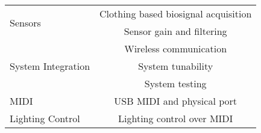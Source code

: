     \begin{tabular}{|l|c|}
        \hline
        \multirow{2}{7em}{Sensors}            & \cellcolor{green!25}Clothing based biosignal acquisition \\ \cline{2-2}
        ~                                     & \cellcolor{green!25}Sensor gain and filtering            \\ \hline \hline
        \multirow{3}{7em}{System Integration} & \cellcolor{green!25}Wireless communication               \\ \cline{2-2}
        ~                                     & \cellcolor{green!25}System tunability                    \\ \cline{2-2}
        ~                                     & \cellcolor{green!25}System testing                       \\ \hline \hline
        MIDI                                  & \cellcolor{green!25}USB MIDI and physical port           \\ \hline \hline
        Lighting Control                      & \cellcolor{green!25}Lighting control over MIDI           \\ \hline
    \end{tabular}
